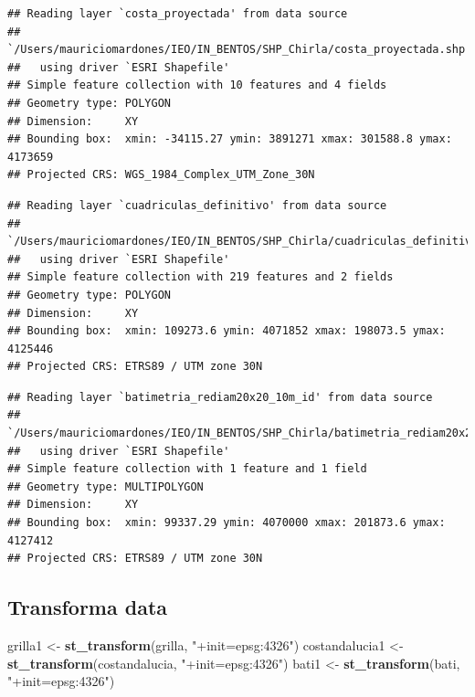 \documentclass[
]{article}
\newenvironment{Shaded}{\begin{snugshade}}{\end{snugshade}}
\newcommand{\FunctionTok}[1]{\textcolor[rgb]{0.13,0.29,0.53}{\textbf{#1}}}
\newcommand{\NormalTok}[1]{#1}
\newcommand{\OtherTok}[1]{\textcolor[rgb]{0.56,0.35,0.01}{#1}}
\newcommand{\StringTok}[1]{\textcolor[rgb]{0.31,0.60,0.02}{#1}}
\begin{document}
\begin{verbatim}
## Reading layer `costa_proyectada' from data source 
##   `/Users/mauriciomardones/IEO/IN_BENTOS/SHP_Chirla/costa_proyectada.shp' 
##   using driver `ESRI Shapefile'
## Simple feature collection with 10 features and 4 fields
## Geometry type: POLYGON
## Dimension:     XY
## Bounding box:  xmin: -34115.27 ymin: 3891271 xmax: 301588.8 ymax: 4173659
## Projected CRS: WGS_1984_Complex_UTM_Zone_30N
\end{verbatim}

\begin{verbatim}
## Reading layer `cuadriculas_definitivo' from data source 
##   `/Users/mauriciomardones/IEO/IN_BENTOS/SHP_Chirla/cuadriculas_definitivo.shp' 
##   using driver `ESRI Shapefile'
## Simple feature collection with 219 features and 2 fields
## Geometry type: POLYGON
## Dimension:     XY
## Bounding box:  xmin: 109273.6 ymin: 4071852 xmax: 198073.5 ymax: 4125446
## Projected CRS: ETRS89 / UTM zone 30N
\end{verbatim}

\begin{verbatim}
## Reading layer `batimetria_rediam20x20_10m_id' from data source 
##   `/Users/mauriciomardones/IEO/IN_BENTOS/SHP_Chirla/batimetria_rediam20x20_10m_id.shp' 
##   using driver `ESRI Shapefile'
## Simple feature collection with 1 feature and 1 field
## Geometry type: MULTIPOLYGON
## Dimension:     XY
## Bounding box:  xmin: 99337.29 ymin: 4070000 xmax: 201873.6 ymax: 4127412
## Projected CRS: ETRS89 / UTM zone 30N
\end{verbatim}

\hypertarget{transforma-data}{%
\subsection{Transforma data}\label{transforma-data}}

\begin{Shaded}
\begin{Highlighting}[]
\NormalTok{grilla1 }\OtherTok{\textless{}{-}} \FunctionTok{st\_transform}\NormalTok{(grilla, }
                        \StringTok{"+init=epsg:4326"}\NormalTok{)}
\NormalTok{costandalucia1 }\OtherTok{\textless{}{-}} \FunctionTok{st\_transform}\NormalTok{(costandalucia,}
                               \StringTok{"+init=epsg:4326"}\NormalTok{)}
\NormalTok{bati1 }\OtherTok{\textless{}{-}} \FunctionTok{st\_transform}\NormalTok{(bati,}
                      \StringTok{"+init=epsg:4326"}\NormalTok{)}
\end{Highlighting}
\end{Shaded}
\end{document}
